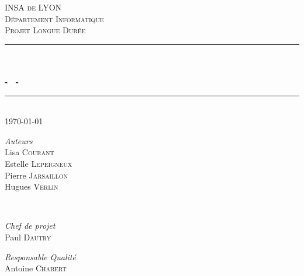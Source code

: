 \begin{titlepage}

\newcommand{\HRule}{\rule{\linewidth}{0.5mm}} %

\center %
 

\vspace*{1cm}

\textsc{\LARGE INSA de LYON}\\[1.5cm] 
\textsc{\Large D\'epartement Informatique}\\[0.5cm] 
\textsc{\large Projet Longue Durée}\\[0.5cm] %


\HRule \\[0.4cm]
{ \huge \bfseries \mainTitle}\\[0.1cm]
{\large \bfseries - \secondTitle~-} 
\HRule \\[1.5cm]
 

{\large \today}\\[2cm] %
 

\begin{minipage}{0.4\textwidth}
\begin{center} \large
\emph{Auteurs} \\
Lisa \textsc{Courant} \\
Estelle \textsc{Lepeigneux} \\
Pierre \textsc{Jarsaillon} \\
Hugues \textsc{Verlin} \\
\end{center}
\end{minipage}
~
\begin{minipage}{0.4\textwidth}
\begin{center} \large
\emph{Chef de projet} \\
Paul \textsc{Dautry}
\end{center}
\begin{center} \large
\emph{Responsable Qualité} \\
Antoine \textsc{Chabert}
\end{center}
\end{minipage}\\[1cm]


\end{titlepage}
